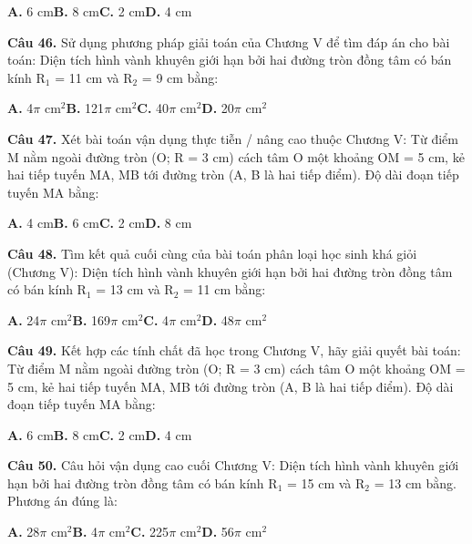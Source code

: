 \documentclass[11pt,a4paper]{article}
\begin{document}
\hspace*{1.5em}\textbf{A.} 6 cm\quad\quad \textbf{B.} 8 cm\quad\quad \textbf{C.} 2 cm\quad\quad \textbf{D.} 4 cm\par\vspace{2pt}
\textbf{\color{primary} Câu 46.} Sử dụng phương pháp giải toán của Chương V để tìm đáp án cho bài toán: Diện tích hình vành khuyên giới hạn bởi hai đường tròn đồng tâm có bán kính R$_1$ = 11 cm và R$_2$ = 9 cm bằng:\par
\hspace*{1.5em}\textbf{A.} 4$\pi$ cm$^2$\quad\quad \textbf{B.} 121$\pi$ cm$^2$\quad\quad \textbf{C.} 40$\pi$ cm$^2$\quad\quad \textbf{D.} 20$\pi$ cm$^2$\par\vspace{2pt}
\textbf{\color{primary} Câu 47.} Xét bài toán vận dụng thực tiễn / nâng cao thuộc Chương V: Từ điểm M nằm ngoài đường tròn (O; R = 3 cm) cách tâm O một khoảng OM = 5 cm, kẻ hai tiếp tuyến MA, MB tới đường tròn (A, B là hai tiếp điểm). Độ dài đoạn tiếp tuyến MA bằng:\par
\hspace*{1.5em}\textbf{A.} 4 cm\quad\quad \textbf{B.} 6 cm\quad\quad \textbf{C.} 2 cm\quad\quad \textbf{D.} 8 cm\par\vspace{2pt}
\textbf{\color{primary} Câu 48.} Tìm kết quả cuối cùng của bài toán phân loại học sinh khá giỏi (Chương V): Diện tích hình vành khuyên giới hạn bởi hai đường tròn đồng tâm có bán kính R$_1$ = 13 cm và R$_2$ = 11 cm bằng:\par
\hspace*{1.5em}\textbf{A.} 24$\pi$ cm$^2$\quad\quad \textbf{B.} 169$\pi$ cm$^2$\quad\quad \textbf{C.} 4$\pi$ cm$^2$\quad\quad \textbf{D.} 48$\pi$ cm$^2$\par\vspace{2pt}
\textbf{\color{primary} Câu 49.} Kết hợp các tính chất đã học trong Chương V, hãy giải quyết bài toán: Từ điểm M nằm ngoài đường tròn (O; R = 3 cm) cách tâm O một khoảng OM = 5 cm, kẻ hai tiếp tuyến MA, MB tới đường tròn (A, B là hai tiếp điểm). Độ dài đoạn tiếp tuyến MA bằng:\par
\hspace*{1.5em}\textbf{A.} 6 cm\quad\quad \textbf{B.} 8 cm\quad\quad \textbf{C.} 2 cm\quad\quad \textbf{D.} 4 cm\par\vspace{2pt}
\textbf{\color{primary} Câu 50.} Câu hỏi vận dụng cao cuối Chương V: Diện tích hình vành khuyên giới hạn bởi hai đường tròn đồng tâm có bán kính R$_1$ = 15 cm và R$_2$ = 13 cm bằng. Phương án đúng là:\par
\hspace*{1.5em}\textbf{A.} 28$\pi$ cm$^2$\quad\quad \textbf{B.} 4$\pi$ cm$^2$\quad\quad \textbf{C.} 225$\pi$ cm$^2$\quad\quad \textbf{D.} 56$\pi$ cm$^2$\par\vspace{2pt}
\end{document}
